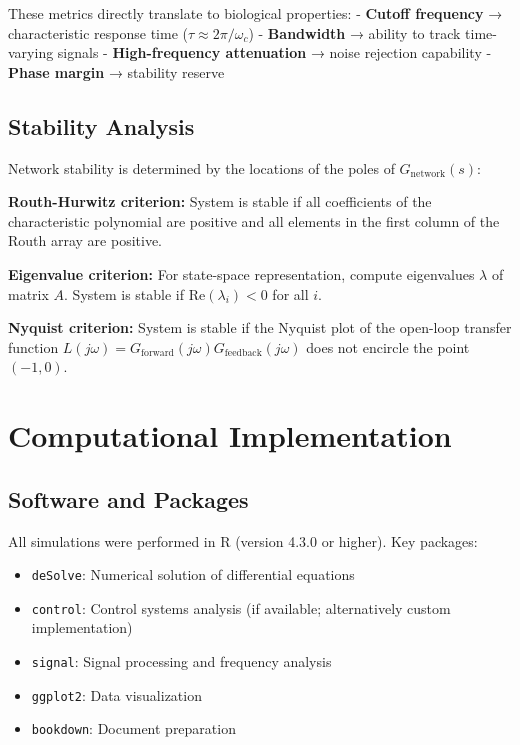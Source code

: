 \documentclass[
]{book}
\providecommand{\tightlist}{%
  \setlength{\itemsep}{0pt}\setlength{\parskip}{0pt}}
\begin{document}
These metrics directly translate to biological properties:
- \textbf{Cutoff frequency} → characteristic response time (\(\tau \approx 2\pi/\omega_c\))
- \textbf{Bandwidth} → ability to track time-varying signals
- \textbf{High-frequency attenuation} → noise rejection capability
- \textbf{Phase margin} → stability reserve

\subsection{Stability Analysis}\label{stability-analysis}

Network stability is determined by the locations of the poles of \(G_{\text{network}}(s)\):

\textbf{Routh-Hurwitz criterion:} System is stable if all coefficients of the characteristic polynomial are positive and all elements in the first column of the Routh array are positive.

\textbf{Eigenvalue criterion:} For state-space representation, compute eigenvalues \(\lambda\) of matrix \(A\). System is stable if \(\text{Re}(\lambda_i) < 0\) for all \(i\).

\textbf{Nyquist criterion:} System is stable if the Nyquist plot of the open-loop transfer function \(L(j\omega) = G_{\text{forward}}(j\omega)G_{\text{feedback}}(j\omega)\) does not encircle the point \((-1, 0)\).

\section{Computational Implementation}\label{computational-implementation}

\subsection{Software and Packages}\label{software-and-packages}

All simulations were performed in R (version 4.3.0 or higher). Key packages:

\begin{itemize}
\tightlist
\item
  \texttt{deSolve}: Numerical solution of differential equations \citep{Soetaert2010}
\item
  \texttt{control}: Control systems analysis (if available; alternatively custom implementation)
\item
  \texttt{signal}: Signal processing and frequency analysis \citep{Signal}
\item
  \texttt{ggplot2}: Data visualization \citep{Wickham2016}
\item
  \texttt{bookdown}: Document preparation \citep{Xie2016}
\end{itemize}
\end{document}
